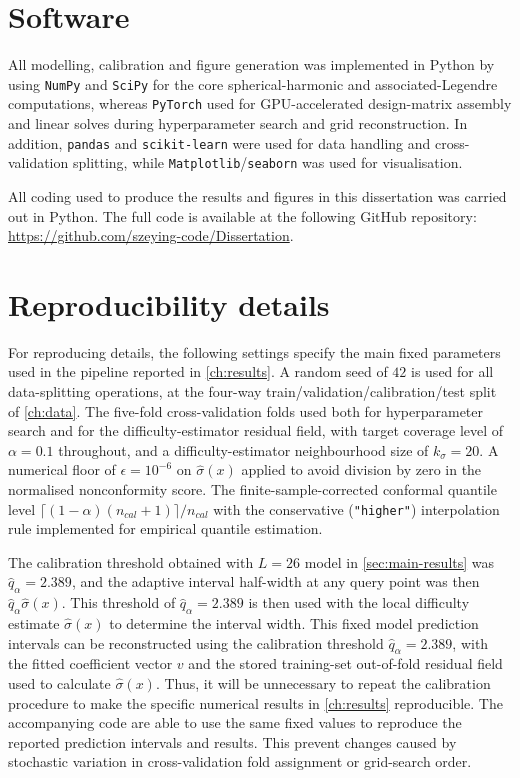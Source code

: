 \documentclass[11pt,a4paper]{report}
\begin{document}
\section{Software}

All modelling, calibration and figure generation was implemented in Python by using \texttt{NumPy} and \texttt{SciPy} for the core spherical-harmonic and associated-Legendre computations, whereas \texttt{PyTorch} used for GPU-accelerated design-matrix assembly and linear solves during hyperparameter search and grid reconstruction. In addition, \texttt{pandas} and \texttt{scikit-learn} were used for data handling and cross-validation splitting, while \texttt{Matplotlib}/\texttt{seaborn} was used for visualisation.

All coding used to produce the results and figures in this dissertation was carried out in Python. The full code is available at the following GitHub repository: \href{https://github.com/szeying-code/Dissertation}{https://github.com/szeying-code/Dissertation}. 

\section{Reproducibility details}

For reproducing details, the following settings specify the main fixed parameters used in the pipeline reported in \cref{ch:results}. A random seed of $42$ is used for all data-splitting operations, at the four-way train/validation/calibration/test split of \cref{ch:data}. The five-fold cross-validation folds used both for hyperparameter search and for the difficulty-estimator residual field, with target coverage level of $\alpha=0.1$ throughout, and a difficulty-estimator neighbourhood size of $k_\sigma=20$. A numerical floor of $\epsilon=10^{-6}$ on $\hat\sigma(x)$ applied to avoid division by zero in the normalised nonconformity score. The finite-sample-corrected conformal quantile level $\lceil(1-\alpha)(n_{cal}+1)\rceil/n_{cal}$ with the conservative (\texttt{"higher"}) interpolation rule implemented for empirical quantile estimation.

The calibration threshold obtained with $L=26$ model in \cref{sec:main-results} was $\hat q_\alpha = 2.389$, and the adaptive interval half-width at any query point was then $\hat q_\alpha\hat\sigma(x)$. This threshold of $\hat q_\alpha = 2.389$ is then used with the local difficulty estimate $\hat\sigma(x)$ to determine the interval width. This fixed model prediction intervals can be reconstructed using the calibration threshold $\hat q_\alpha = 2.389$, with the fitted coefficient vector $v$ and the stored training-set out-of-fold residual field used to calculate $\hat\sigma(x)$. Thus, it will be unnecessary to repeat the calibration procedure to make the specific numerical results in \cref{ch:results} reproducible. The accompanying code are able to use the same fixed values to reproduce the reported prediction intervals and results. This prevent changes caused by stochastic variation in cross-validation fold assignment or grid-search order.

 
\end{document}

